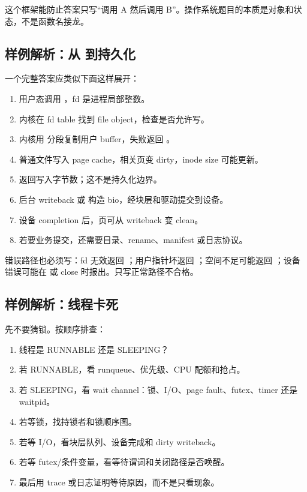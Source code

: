 这个框架能防止答案只写“调用 A 然后调用 B”。操作系统题目的本质是对象和状态，不是函数名接龙。

\subsection{样例解析：从  到持久化}

一个完整答案应类似下面这样展开：

\begin{enumerate}
\tightlist
\item 用户态调用 ，fd 是进程局部整数。
\item 内核在 fd table 找到 file object，检查是否允许写。
\item 内核用  分段复制用户 buffer，失败返回 。
\item 普通文件写入 page cache，相关页变 dirty，inode size 可能更新。
\item {} 返回写入字节数；这不是持久化边界。
\item 后台 writeback 或  构造 bio，经块层和驱动提交到设备。
\item 设备 completion 后，页可从 writeback 变 clean。
\item 若要业务提交，还需要目录、rename、manifest 或日志协议。
\end{enumerate}

错误路径也必须写：fd 无效返回 ；用户指针坏返回 ；空间不足可能返回 ；设备错误可能在  或 close 时报出。只写正常路径不合格。

\subsection{样例解析：线程卡死}

先不要猜锁。按顺序排查：

\begin{enumerate}
\tightlist
\item 线程是 RUNNABLE 还是 SLEEPING？
\item 若 RUNNABLE，看 runqueue、优先级、CPU 配额和抢占。
\item 若 SLEEPING，看 wait channel：锁、I/O、page fault、futex、timer 还是 waitpid。
\item 若等锁，找持锁者和锁顺序图。
\item 若等 I/O，看块层队列、设备完成和 dirty writeback。
\item 若等 futex/条件变量，看等待谓词和关闭路径是否唤醒。
\item 最后用 trace 或日志证明等待原因，而不是只看现象。
\end{enumerate}

